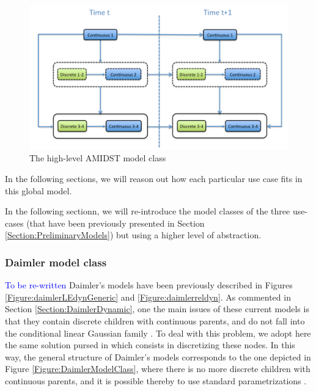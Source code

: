 \begin{figure}[ht!]
\begin{center}
\includegraphics[scale=0.4]{./figures/AMIDSTModelClassGeneral}
\caption{\label{Figure:AMIDSTModelClassHighLevel} The high-level AMIDST model class}
\end{center}
\end{figure}

In the following sections, we will reason out how each particular use case fits in this global model.


In the following sectionn, we will re-introduce the model classes of the three use-cases (that have been previously presented in Section \ref{Section:PreliminaryModels}) but using a higher level of abstraction. 

\subsubsection{Daimler model class}

\textcolor{blue}{To be re-written}
Daimler's models have been previously described in Figures \ref{Figure:daimlerLEdynGeneric} and \ref{Figure:daimlerreldyn}. As commented in Section \ref{Section:DaimlerDynamic}, one the main issues of these current models is that they contain discrete children with continuous parents, and do not fall into the conditional linear Gaussian family \cite{JensenNielsen2007}. To deal with this problem, we adopt here the same solution pursed in \cite{kasper2012object} which consists in discretizing these nodes. In this way, the general structure of Daimler's models corresponds to the one depicted in Figure \ref{Figure:DaimlerModelClass}, where there is no more discrete children with continuous parents, and it is possible thereby to use standard parametrizations \cite{JensenNielsen2007}. 


